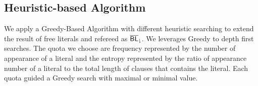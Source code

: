 




\subsection{Heuristic-based Algorithm}


We apply a Greedy-Based Algorithm with different heuristic searching to extend the result of free literals and refereed as ${\sf \overline{BL}_\downharpoonright}$. We leverages Greedy to depth first searches. The quota we choose are frequency represented by the number of appearance of a literal and the entropy represented by the ratio of appearance number of a literal to the total length of clauses that contains the literal. Each quota guided a Greedy search with maximal or minimal value.

